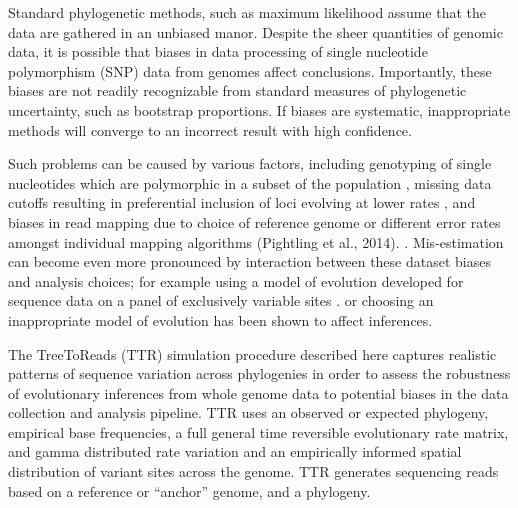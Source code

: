 \documentclass{bioinfo}
\begin{document}
Standard phylogenetic methods, such as maximum likelihood assume that the data are gathered in an unbiased manor.
Despite the sheer quantities of genomic data, it is possible that biases in data processing of single nucleotide polymorphism (SNP) data from genomes
affect conclusions.
Importantly, these biases are not readily recognizable from standard measures of phylogenetic uncertainty, 
such as bootstrap proportions.
If biases are systematic, inappropriate methods will converge to an incorrect result with high confidence.

Such problems can be caused by various factors, 
including genotyping of single nucleotides which are polymorphic in a subset of the population \citep{mctavish_how_2015},
missing data cutoffs resulting in preferential inclusion of loci evolving at lower rates \citep{huang_unforeseen_2014},
and biases in read mapping due to choice of reference genome \citep{bertels_automated_2014} or different error rates amongst 
individual mapping algorithms (Pightling et al., 2014). .
Mis-estimation can become even more pronounced by interaction between these dataset biases and analysis choices;
for example using a model of evolution developed for sequence data 
on a panel of exclusively variable sites \citep{lewis_likelihood_2001}.
or choosing an inappropriate model of evolution \citep{sullivan_are_1997} has been shown to affect inferences.

The TreeToReads (TTR) simulation procedure described here captures realistic patterns of sequence variation across phylogenies in order to assess the robustness of evolutionary inferences from whole genome data to potential biases in the data collection and analysis pipeline.
TTR uses an observed or expected phylogeny, empirical base frequencies, a full general time reversible evolutionary rate matrix, and gamma distributed rate variation and an empirically informed spatial distribution of variant sites across the genome. 
TTR generates sequencing reads based on a reference or ``anchor'' genome, and a phylogeny.
\end{document}
